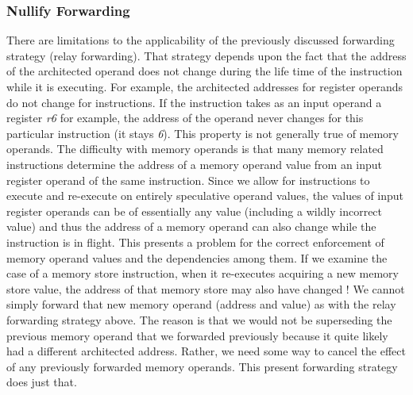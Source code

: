 \documentclass[10pt,twocolumn]{article}
\begin{document}
\subsubsection{Nullify Forwarding}
\vspace{-0.15in}
%
There are limitations to the applicability of the previously
discussed forwarding strategy (relay forwarding).
That strategy depends upon the fact that the address of the
architected operand does not change during the life time of
the instruction while it is executing.
For example, the architected addresses for register operands
do not change for instructions.  If the instruction takes
as an input operand a register \textit{r6} for example,
the address of the operand never changes for this particular
instruction (it stays \textit{6}).
This property is not generally true of memory operands.
The difficulty with memory operands is that many memory
related instructions determine the address of a memory operand
value from an input register operand of the same instruction.
Since we allow for instructions to execute and re-execute
on entirely speculative operand values, the values of
input register operands can be of essentially any value
(including a wildly incorrect value) and thus the
address of a memory operand can also change while 
the instruction is in flight.
This presents a problem for the correct enforcement of
memory operand values and the dependencies among them.
If we examine the case of a memory store instruction,
when it
re-executes acquiring a new memory store value, the address of that
memory store may also have changed !  
We cannot simply forward that new memory operand (address and value)
as with the relay forwarding strategy above.  The reason is
that we would not be superseding the previous memory operand
that we forwarded previously because it quite likely had a different
architected address.  Rather, we need some way to cancel the effect of
any previously forwarded memory operands.
This present forwarding strategy does just that.
\end{document}
